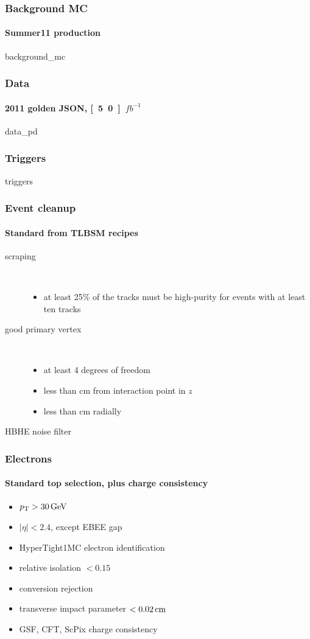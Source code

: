 \documentclass[ukenglish]{beamer}
\begin{document}
\begin{frame}
    \frametitle{Background MC}
    \framesubtitle{Summer11 production}
    {background_mc}
\end{frame}

\begin{frame}
    \frametitle{Data}
    \framesubtitle{2011 golden JSON, \unit[5.0]{$fb^{-1}$}}
    {data_pd}
\end{frame}

\begin{frame}
    \frametitle{Triggers}
    {triggers}
\end{frame}

\begin{frame}
    \frametitle{Event cleanup}
    \framesubtitle{Standard from TLBSM recipes}
    \begin{description}
        \item[scraping]\hspace*{\fill}\\
            \begin{itemize}
                \item at least 25\% of the tracks must be high-purity for events
            with at least ten tracks
            \end{itemize}
        \item[good primary vertex] \hspace*{\fill}\\
            \begin{itemize}
                \item at least 4 degrees of freedom
                \item less than \unit[25]{cm} from interaction point in $z$
                \item less than \unit[2]{cm} radially
            \end{itemize}
        \item[HBHE noise filter] 
    \end{description}
\end{frame}

\begin{frame}
    \frametitle{Electrons}
    \framesubtitle{Standard top selection, plus charge consistency}
    \begin{itemize}
        \item $\pt > \unit[30]{GeV}$
        \item $|\eta| < 2.4$, except EBEE gap
        \item HyperTight1MC electron identification
        \item relative isolation $< 0.15$
        \item conversion rejection
        \item transverse impact parameter $< \unit[0.02]{cm}$
        \item GSF, CFT, ScPix charge consistency
    \end{itemize}
\end{frame}
\end{document}

